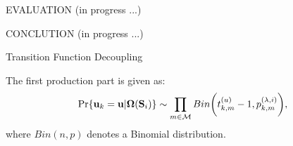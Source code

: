 \documentclass[10pt, conference, letterpaper]{IEEEtran}
\renewcommand{\vec}{\mathbf}
\DeclarePairedDelimiter{\Paren}{\bigg(}{\bigg)}
\newcommand{\esSet}{\mathcal{M}}
\newcommand{\Stat}{\mathbf{S}}
\newcommand{\Policy}{\mathbf{\Omega}}
\begin{document}
    \begin{section}{EVALUATION}
        \label{sec:evaluation}
        (in progress ...)
    \end{section}

    \begin{section}{CONCLUTION}
        \label{sec:conclusion}
        (in progress ...)
    \end{section}
    
    \appendices

    \begin{section}{Transition Function Decoupling}
        \label{trans-decouple}

        The first production part is given as:
        \begin{align*}
            \Pr\{\vec{u}_k=\vec{u}|\Policy(\Stat_i)\} \sim \prod_{m\in\esSet}
                Bin\Paren{t^{(u)}_{k,m}-1,p^{(\lambda, i)}_{k,m}},
        \end{align*}
        where $Bin(n,p)$ denotes a Binomial distribution.
            

\end{section}
\end{document}
